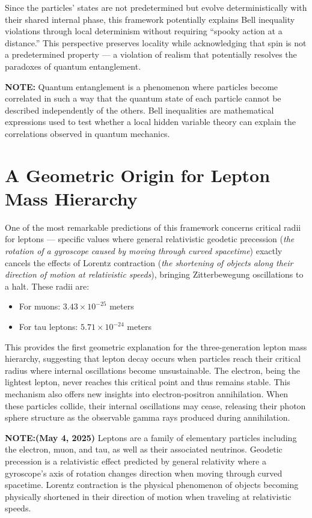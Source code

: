 \documentclass[12pt,letterpaper]{article} %
\begin{document}
Since the particles' states are not predetermined but evolve deterministically with their shared internal phase, this framework potentially explains Bell inequality violations through local determinism without requiring ``spooky action at a distance.'' This perspective preserves locality while acknowledging that spin is not a predetermined property --- a violation of realism that potentially resolves the paradoxes of quantum entanglement.

\vspace{0.5cm}
\noindent\textbf{NOTE:} Quantum entanglement is a phenomenon where particles become correlated in such a way that the quantum state of each particle cannot be described independently of the others. Bell inequalities are mathematical expressions used to test whether a local hidden variable theory can explain the correlations observed in quantum mechanics.

\section{A Geometric Origin for Lepton Mass Hierarchy}
One of the most remarkable predictions of this framework concerns critical radii for leptons --- specific values where general relativistic geodetic precession (\textit{the rotation of a gyroscope caused by moving through curved spacetime})\cite{hartle2021} exactly cancels the effects of Lorentz contraction (\textit{the shortening of objects along their direction of motion at relativistic speeds}), bringing Zitterbewegung oscillations to a halt. These radii are:
\begin{itemize}
\item For muons: $3.43 \times 10^{-25}$ meters
\item For tau leptons: $5.71 \times 10^{-24}$ meters
\end{itemize}
This provides the first geometric explanation for the three-generation lepton mass hierarchy, suggesting that lepton decay occurs when particles reach their critical radius where internal oscillations become unsustainable. The electron, being the lightest lepton, never reaches this critical point and thus remains stable.
This mechanism also offers new insights into electron-positron annihilation\cite{hanamura2021}. When these particles collide, their internal oscillations may cease, releasing their photon sphere structure as the observable gamma rays produced during annihilation.

\vspace{0.5cm}
\noindent\textbf{NOTE:(May 4, 2025)} Leptons are a family of elementary particles including the electron, muon, and tau, as well as their associated neutrinos. Geodetic precession is a relativistic effect predicted by general relativity where a gyroscope's axis of rotation changes direction when moving through curved spacetime. Lorentz contraction is the physical phenomenon of objects becoming physically shortened in their direction of motion when traveling at relativistic speeds.
\end{document}
